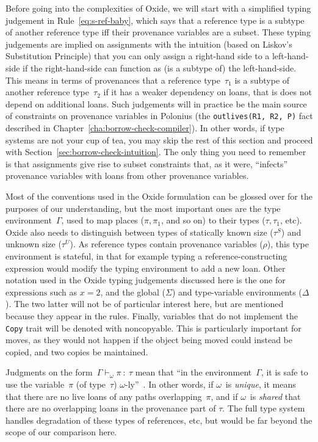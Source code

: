 \documentclass[11pt,a4paper,twoside,openany,draft]{report}
\newcommand{\InRust}[1]{\texttt{#1}}
\newcommand{\InDatalog}[1]{\texttt{#1}}
\newcommand{\expression}[1]{\boxed{#1}}
\newcommand{\decoline}{%
   \par
   \vspace{\baselineskip}
   \hfill
   \ding{100}
   \hfill
   \vspace{\baselineskip}
\par}
\begin{document}
Before going into the complexities of Oxide, we will start with a simplified
typing judgement in Rule~\eqref{eq:s-ref-baby}, which says that a reference type
is a subtype of another reference type iff their provenance variables are a
subset. These typing judgements are implied on assignments with the intuition
(based on Liskov's Substitution Principle) that you can only assign a right-hand
side to a left-hand-side if the right-hand-side can function as (is a subtype
of) the left-hand-side. This means in terms of provenances that a reference
type~$\tau_1$ is a subtype of another reference type~$\tau_2$ if it has a weaker
dependency on loans, that is does not depend on additional loans. Such
judgements will in practice be the main source of constraints on provenance
variables in Polonius (the \InDatalog{outlives(R1, R2, P)} fact described in
Chapter~\ref{cha:borrow-check-compiler}). In other words, if type systems are
not your cup of tea, you may skip the rest of this section and proceed with
Section~\ref{sec:borrow-check-intuition}. The only thing you need to remember is
that assignments give rise to subset constraints that, as it were, ``infects''
provenance variables with loans from other provenance variables.

\decoline{}

Most of the conventions used in the Oxide formulation can be glossed over for
the purposes of our understanding, but the most important ones are the type
environment~$\Gamma$, used to map places ($\pi, \pi_1$, and so on) to their
types ($\tau, \tau_1$, etc). Oxide also needs to distinguish between types of
statically known size ($\tau^S$) and unknown size ($\tau^U$). As reference types
contain provenance variables ($\rho$), this type environment is stateful, in
that for example typing a reference-constructing expression would modify the
typing environment to add a new loan. Other notation used in the Oxide typing
judgements discussed here is the one for $\expression{\text{expressions}}$ such
as $\expression{x = 2}$, and the global ($\Sigma$) and type-variable
environments ($\Delta$). The two latter will not be of particular interest here,
but are mentioned because they appear in the rules. Finally, variables that do
not implement the \InRust{Copy} trait will be denoted with $\text{noncopyable}$.
This is particularly important for moves, as they would not happen if the object
being moved could instead be copied, and two copies be maintained.


Judgments on the form~$\Gamma \vdash_{\omega} \pi \: : \: \tau$ mean that ``in
the environment~$\Gamma$, it is safe to use the variable~$\pi$ (of type~$\tau$)
$\omega$-ly''~\cite{weiss_oxide:_2019}. In other words, if $\omega$~is
\emph{unique}, it means that there are no live loans of any paths
overlapping~$\pi$, and if $\omega$~is \emph{shared} that there are no
overlapping loans in the provenance part of $\tau$. The full type system handles
degradation of these types of references, etc, but would be far beyond the scope
of our comparison here.
\end{document}
